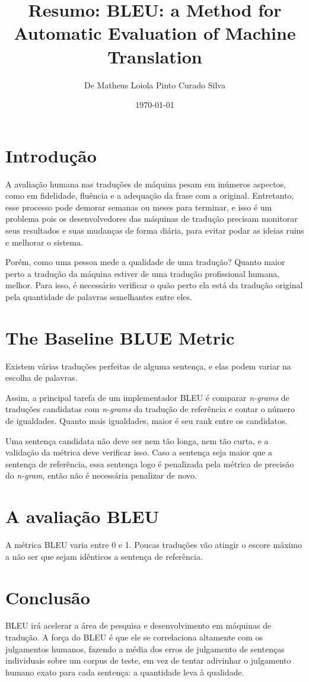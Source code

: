\documentclass[12pt]{article}
\title{Resumo: BLEU: a Method for Automatic Evaluation of Machine Translation}
\author{De Matheus Loiola Pinto Curado Silva}
\date{\today}
\begin{document}
	
\maketitle

\section*{Introdução}

A avaliação humana nas traduções de máquina pesam em inúmeros aspectos, como em fidelidade, fluência e a adequação da frase com a original. Entretanto, esse processo pode demorar semanas ou meses para terminar, e isso é um problema pois os desenvolvedores das máquinas de tradução precisam monitorar seus resultados e suas mudanças de forma diária, para evitar podar as ideias ruins e melhorar o sistema.

Porém, como uma pessoa mede a qualidade de uma tradução? Quanto maior perto a tradução da máquina estiver de uma tradução profissional humana, melhor. Para isso, é necessário verificar o quão perto ela está da tradução original pela quantidade de palavras semelhantes entre eles.

\section*{The Baseline BLUE Metric}

Existem várias traduções perfeitas de alguma sentença, e elas podem variar na escolha de palavras.

Assim, a principal tarefa de um implementador BLEU é comparar \textit{n-grams} de traduções candidatas com \textit{n-grams} da tradução de referência e contar o número de igualdades. Quanto mais igualdades, maior é seu rank entre os candidatos.

Uma sentença candidata não deve ser nem tão longa, nem tão curta, e a validação da métrica deve verificar isso. Caso a sentença seja maior que a sentença de referência, essa sentença logo é penalizada pela métrica de precisão do \textit{n-gram}, então não é necessária penalizar de novo.

\section*{A avaliação BLEU}

A métrica BLEU varia entre 0 e 1. Poucas traduções vão atingir o escore máximo a não ser que sejam idênticos a sentença de referência.

\section*{Conclusão}

BLEU irá acelerar a área de pesquisa e desenvolvimento em máquinas de tradução. A força do BLEU é que ele se correlaciona altamente com os julgamentos humanos, fazendo a média dos erros de julgamento de sentenças individuais sobre um corpus de teste, em vez de tentar adivinhar o julgamento humano exato para cada sentença: a quantidade leva à qualidade.
\end{document}
